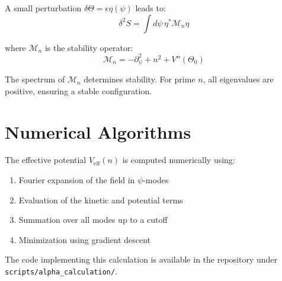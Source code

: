 \documentclass[12pt, a4paper]{article}
\theoremstyle{definition}
\theoremstyle{remark}
\begin{document}
A small perturbation $\delta\Theta = \epsilon \eta(\psi)$ leads to:
\begin{equation}
\delta^2 S = \int d\psi \, \eta^* \mathcal{M}_n \eta
\end{equation}

where $\mathcal{M}_n$ is the stability operator:
\begin{equation}
\mathcal{M}_n = -\partial_\psi^2 + n^2 + V''(\Theta_0)
\end{equation}

The spectrum of $\mathcal{M}_n$ determines stability. For prime $n$, all eigenvalues are positive, ensuring a stable configuration.

\section{Numerical Algorithms}

The effective potential $V_{\text{eff}}(n)$ is computed numerically using:
\begin{enumerate}
\item Fourier expansion of the field in $\psi$-modes
\item Evaluation of the kinetic and potential terms
\item Summation over all modes up to a cutoff
\item Minimization using gradient descent
\end{enumerate}

The code implementing this calculation is available in the repository under \texttt{scripts/alpha\_calculation/}.
\end{document}
